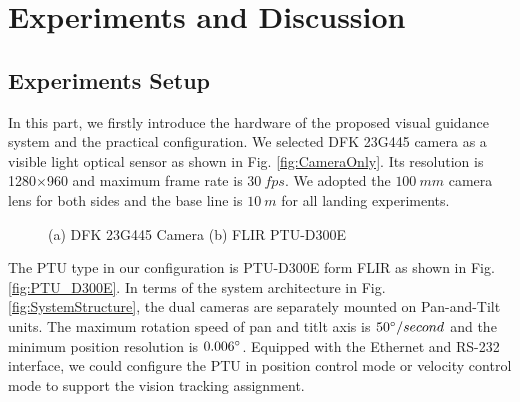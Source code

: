 \section{Experiments and Discussion}
\subsection{Experiments Setup}
In this part, we firstly introduce the hardware of the proposed visual guidance system and the practical configuration. We selected DFK 23G445 camera as a visible light optical sensor as shown in Fig. \ref{fig:CameraOnly}. Its resolution is 1280$\times$960 and maximum frame rate is $30\ fps$. We adopted the $100\ mm$ camera lens for both sides and the base line is $10\ m$ for all landing experiments.
 


\begin{figure}[!tb]
	\centering
	\caption{(a) DFK 23G445 Camera (b) FLIR PTU-D300E}
\end{figure}

The PTU type in our configuration is PTU-D300E form FLIR as shown in Fig.\ref{fig:PTU_D300E}. In terms of the system architecture in Fig. \ref{fig:SystemStructure}, the dual cameras are separately mounted on Pan-and-Tilt units. The maximum rotation speed of pan and titlt axis is $50\degree/second$ and the minimum position resolution is $0.006\degree$. Equipped with the Ethernet and RS-232 interface, we could configure the PTU in position control mode or velocity control mode to support the vision tracking assignment.

